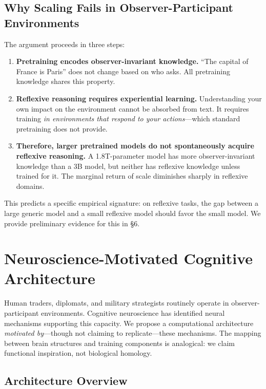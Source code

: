 \documentclass[11pt,a4paper]{article}
\begin{document}
\subsection{Why Scaling Fails in Observer-Participant Environments}

The argument proceeds in three steps:

\begin{enumerate}[leftmargin=*]
\item \textbf{Pretraining encodes observer-invariant knowledge.} ``The capital of France is Paris'' does not change based on who asks. All pretraining knowledge shares this property.
\item \textbf{Reflexive reasoning requires experiential learning.} Understanding your own impact on the environment cannot be absorbed from text. It requires training \textit{in environments that respond to your actions}---which standard pretraining does not provide.
\item \textbf{Therefore, larger pretrained models do not spontaneously acquire reflexive reasoning.} A 1.8T-parameter model has more observer-invariant knowledge than a 3B model, but neither has reflexive knowledge unless trained for it. The marginal return of scale diminishes sharply in reflexive domains.
\end{enumerate}

This predicts a specific empirical signature: on reflexive tasks, the gap between a large generic model and a small reflexive model should favor the small model. We provide preliminary evidence for this in \S6.

\section{Neuroscience-Motivated Cognitive Architecture}

Human traders, diplomats, and military strategists routinely operate in observer-participant environments. Cognitive neuroscience has identified neural mechanisms supporting this capacity. We propose a computational architecture \textit{motivated by}---though not claiming to replicate---these mechanisms. The mapping between brain structures and training components is analogical: we claim functional inspiration, not biological homology.

\subsection{Architecture Overview}
\end{document}
